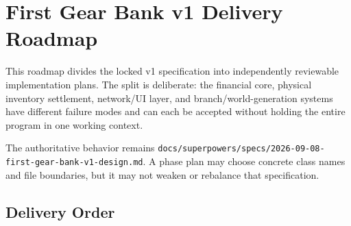 \documentclass[
  9pt,
  letterpaper,
]{extarticle}
\author{}
\date{}
\begin{document}
\section{First Gear Bank v1 Delivery
Roadmap}\label{first-gear-bank-v1-delivery-roadmap}

This roadmap divides the locked v1 specification into independently
reviewable implementation plans. The split is deliberate: the financial
core, physical inventory settlement, network/UI layer, and
branch/world-generation systems have different failure modes and can
each be accepted without holding the entire program in one working
context.

The authoritative behavior remains
\texttt{docs/}\allowbreak{}\texttt{superpowers/}\allowbreak{}\texttt{specs/}\allowbreak{}\texttt{2026-}\allowbreak{}\texttt{09-}\allowbreak{}\texttt{08-}\allowbreak{}\texttt{first-}\allowbreak{}\texttt{gear-}\allowbreak{}\texttt{bank-}\allowbreak{}\texttt{v1-}\allowbreak{}\texttt{design.}\allowbreak{}\texttt{md}.
A phase plan may choose concrete class names and file boundaries, but it
may not weaken or rebalance that specification.

\subsection{Delivery Order}\label{delivery-order}
\end{document}
